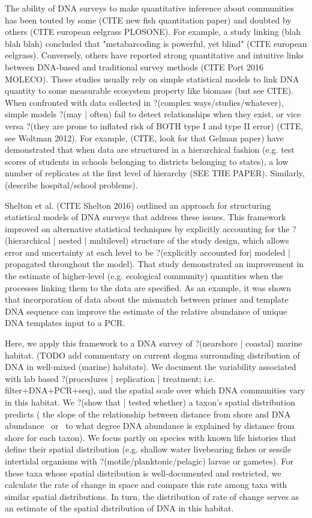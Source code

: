 \documentclass[11pt,letterpaper]{article} %
\begin{document}
The ability of DNA surveys to make quantitative inference about communities has been touted by some (CITE new fish quantitation paper) and doubted by others (CITE european eelgrass PLOSONE).
For example, a study linking (blah blah blah) concluded that "metabarcoding is powerful, yet blind" (CITE european eelgrass).
Conversely, others have reported strong quantitative and intuitive links between DNA-based and traditional survey methods (CITE Port 2016 MOLECO).
These studies usually rely on simple statistical models to link DNA quantity to some measurable ecosystem property like biomass (but see CITE).
When confronted with data collected in ?(complex ways/studies/whatever), simple models ?(may | often) fail to detect relationships when they exist, or vice versa ?(they are prone to inflated risk of BOTH type I and type II error) (CITE, see Woltman 2012).
For example, (CITE, look for that Gelman paper) have demonstrated that when data are structured in a hierarchical fashion (e.g. test scores of students in schools belonging to districts belonging to states), a low number of replicates at the first level of hierarchy (SEE THE PAPER).
Similarly, (describe hospital/school problems).

Shelton et al. (CITE Shelton 2016) outlined an approach for structuring statistical models of DNA surveys that address these issues.
This framework improved on alternative statistical techniques by explicitly accounting for the ?(hierarchical | nested | multilevel) structure of the study design, which allows error and uncertainty at each level to be ?(explicitly accounted for| modeled | propagated throughout the model).
That study demonstrated an improvement in the estimate of higher-level (e.g. ecological community) quantities when the processes linking them to the data are specified.
As an example, it was shown that incorporation of data about the mismatch between primer and template DNA sequence can improve the estimate of the relative abundance of unique DNA templates input to a PCR.

Here, we apply this framework to a DNA survey of ?(nearshore | coastal) marine habitat.
(TODO add commentary on current dogma surrounding distribution of DNA in well-mixed (marine) habitats).
We document the variability associated with lab based ?(procedures | replication | treatment; i.e. filter+DNA+PCR+seq), and the spatial scale over which DNA communities vary in this habitat.
We ?(show that | tested whether) a taxon's spatial distribution predicts ( the slope of the relationship between distance from shore and DNA abundance ~or~ to what degree DNA abundance is explained by distance from shore for each taxon).
We focus partly on species with known life histories that define their spatial distribution (e.g. shallow water livebearing fishes or sessile intertidal organisms with ?(motile/planktonic/pelagic) larvae or gametes).
For these taxa whose spatial distribution is well-documented and restricted, we calculate the rate of change in space and compare this rate among taxa with similar spatial distributions.
In turn, the distribution of rate of change serves as an estimate of the spatial distribution of DNA in this habitat.
\end{document}
